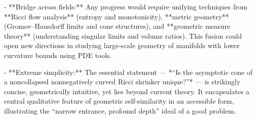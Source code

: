 - **Bridge across fields:**  
  Any progress would require unifying techniques from **Ricci flow analysis** (entropy and monotonicity), **metric geometry** (Gromov–Hausdorff limits and cone structures), and **geometric measure theory** (understanding singular limits and volume ratios). This fusion could open new directions in studying large‑scale geometry of manifolds with lower curvature bounds using PDE tools.

- **Extreme simplicity:**  
  The essential statement —  
  *“Is the asymptotic cone of a noncollapsed nonnegatively curved Ricci shrinker unique?”* —  
  is strikingly concise, geometrically intuitive, yet lies beyond current theory. It encapsulates a central qualitative feature of geometric self‑similarity in an accessible form, illustrating the “narrow entrance, profound depth” ideal of a good problem.